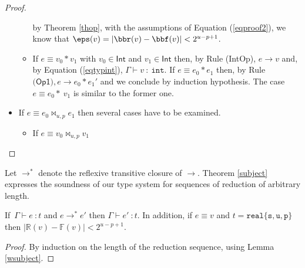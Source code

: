 \begin{proof}
\begin{itemize}
\begin{itemize}
by Theorem \ref{thop}, with  the assumptions of Equation (\ref{eqproof2}), we know that $\eps(v)=|\bbr(v)-\bbf(v)|<2^{u-p+1}$.
\item If $e\equiv v_0\ast v_1$ with $v_0\in\mathsf{Int}$ and $v_1\in\mathsf{Int}$ then,
by Rule \textsf{(IntOp)}, $e\rightarrow v$ and,
by Equation (\ref{eqtypint}), $\Gamma\vdash v\ :\ \mathtt{int}$.
If $e\equiv e_0\ast e_1$ then, by Rule $\textsf{(Op1)}, e\rightarrow e_0\ast e_1'$ and we conclude by
induction hypothesis. The case $e\equiv e_0\ast\ v_1$ is similar to the former one.
\end{itemize}
\item If $e\equiv e_0\Join_{u,p} e_1$ then several cases have to be examined.
\begin{itemize}
\item If $e\equiv v_0\Join_{u,p} v_1$
\end{itemize}
\end{itemize}
\end{proof}



Let $\rightarrow^*$ denote the reflexive transitive closure of $\rightarrow$.
Theorem \ref{subject} expresses the soundness of our type system for sequences of reduction
of arbitrary length.

\begin{theorem}
\label{subject}
If\ $\Gamma \vdash e\ : t$ and $e\rightarrow^* e'$ then $\Gamma \vdash e'\ : t$. In addition,
if $e\equiv v$ and $t=\mathtt{real\{s,u,p\}}$ then $|\mathbb{R}(v)-\mathbb{F}(v)|< 2^{u-p+1}$.
\end{theorem} 

\begin{proof}
By induction on the length of the reduction sequence, using Lemma \ref{wsubject}.
\end{proof}




